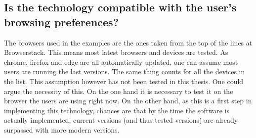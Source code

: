 \subsection {Is the technology compatible with the user's browsing preferences?}
The browsers used in the examples are the ones taken from the top of the lines at Browserstack. This means most latest browsers and devices are tested. As chrome, firefox and edge are all automatically updated, one can assume most users are running the last versions. The same thing counts for all the devices in the list. This assumption however has not been tested in this thesis. One could argue the necessity of this. On the one hand it is necessary to test it on the browser the users are using right now. On the other hand, as this is a first step in implementing this technology, chances are that by the time the software is actually implemented, current versions (and thus tested versions) are already surpassed with more modern versions.


